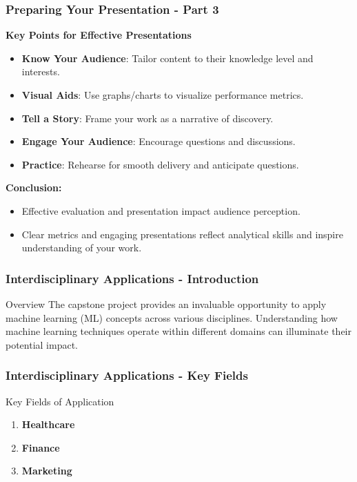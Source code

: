 \documentclass[aspectratio=169]{beamer}
\begin{document}
\begin{frame}[fragile]
    \frametitle{Preparing Your Presentation - Part 3}
    \textbf{Key Points for Effective Presentations}
    \begin{itemize}
        \item \textbf{Know Your Audience}: Tailor content to their knowledge level and interests.
        \item \textbf{Visual Aids}: Use graphs/charts to visualize performance metrics.
        \item \textbf{Tell a Story}: Frame your work as a narrative of discovery.
        \item \textbf{Engage Your Audience}: Encourage questions and discussions.
        \item \textbf{Practice}: Rehearse for smooth delivery and anticipate questions.
    \end{itemize}
    
    \textbf{Conclusion:}
    \begin{itemize}
        \item Effective evaluation and presentation impact audience perception.
        \item Clear metrics and engaging presentations reflect analytical skills and inspire understanding of your work.
    \end{itemize}
\end{frame}

\begin{frame}[fragile]
    \frametitle{Interdisciplinary Applications - Introduction}
    \begin{block}{Overview}
        The capstone project provides an invaluable opportunity to apply machine learning (ML) concepts across various disciplines. 
        Understanding how machine learning techniques operate within different domains can illuminate their potential impact.
    \end{block}
\end{frame}

\begin{frame}[fragile]
    \frametitle{Interdisciplinary Applications - Key Fields}
    \begin{block}{Key Fields of Application}
        \begin{enumerate}
            \item \textbf{Healthcare}
            \item \textbf{Finance}
            \item \textbf{Marketing}
        \end{enumerate}
    \end{block}
\end{frame}
\end{document}
